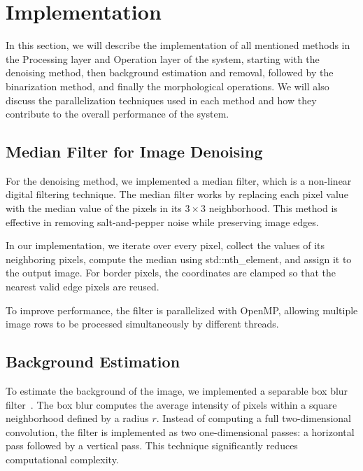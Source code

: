 \section{Implementation}
\label{sec:implementation}

In this section, we will describe the implementation of all mentioned methods in the Processing layer and Operation layer of the system, starting with the denoising method, then background estimation and removal, followed by the binarization method, and finally the morphological operations. We will also discuss the parallelization techniques used in each method and how they contribute to the overall performance of the system.
\subsection{Median Filter for Image Denoising}

For the denoising method, we implemented a median filter, which is a non-linear digital filtering technique. The median filter works by replacing each pixel value with the median value of the pixels in its $3 \times 3$ neighborhood. This method is effective in removing salt-and-pepper noise while preserving image edges.

In our implementation, we iterate over every pixel, collect the values of its neighboring pixels, compute the median using std::nth\_element, and assign it to the output image. For border pixels, the coordinates are clamped so that the nearest valid edge pixels are reused.

To improve performance, the filter is parallelized with OpenMP, allowing multiple image rows to be processed simultaneously by different threads.

\subsection{Background Estimation}

To estimate the background of the image, we implemented a separable box blur filter~\cite{Gonzalez2008Digital}. 
The box blur computes the average intensity of pixels within a square neighborhood 
defined by a radius $r$. Instead of computing a full two-dimensional convolution, 
the filter is implemented as two one-dimensional passes: a horizontal pass followed 
by a vertical pass. This technique significantly reduces computational complexity.

